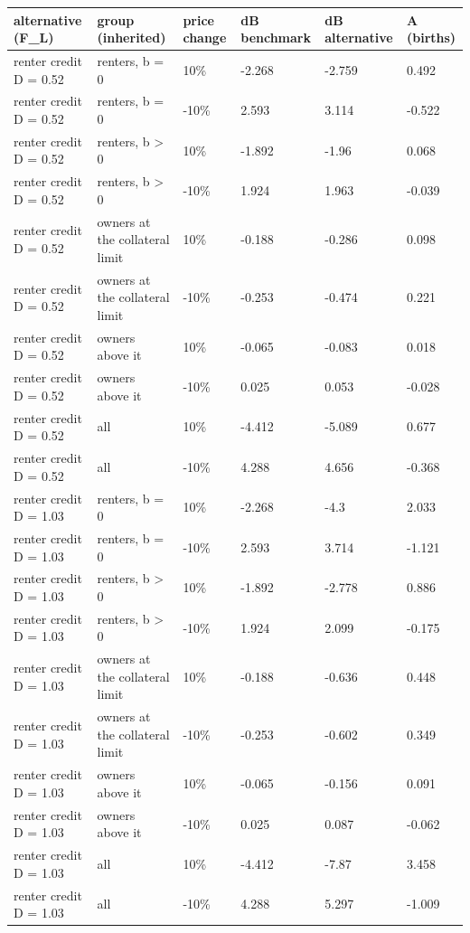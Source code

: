 \begingroup\small
\setlength{\tabcolsep}{3pt}
\renewcommand{\arraystretch}{1.04}
\begin{tabularx}{\linewidth}{XXXXXX}
\toprule
alternative (F\_L) & group (inherited) & price change & dB benchmark & dB alternative & A (births) \\
\midrule
renter credit D = 0.52 & renters, b = 0 & 10\% & -2.268 & -2.759 & 0.492 \\
renter credit D = 0.52 & renters, b = 0 & -10\% & 2.593 & 3.114 & -0.522 \\
renter credit D = 0.52 & renters, b \textgreater{} 0 & 10\% & -1.892 & -1.96 & 0.068 \\
renter credit D = 0.52 & renters, b \textgreater{} 0 & -10\% & 1.924 & 1.963 & -0.039 \\
renter credit D = 0.52 & owners at the collateral limit & 10\% & -0.188 & -0.286 & 0.098 \\
renter credit D = 0.52 & owners at the collateral limit & -10\% & -0.253 & -0.474 & 0.221 \\
renter credit D = 0.52 & owners above it & 10\% & -0.065 & -0.083 & 0.018 \\
renter credit D = 0.52 & owners above it & -10\% & 0.025 & 0.053 & -0.028 \\
renter credit D = 0.52 & all & 10\% & -4.412 & -5.089 & 0.677 \\
renter credit D = 0.52 & all & -10\% & 4.288 & 4.656 & -0.368 \\
renter credit D = 1.03 & renters, b = 0 & 10\% & -2.268 & -4.3 & 2.033 \\
renter credit D = 1.03 & renters, b = 0 & -10\% & 2.593 & 3.714 & -1.121 \\
renter credit D = 1.03 & renters, b \textgreater{} 0 & 10\% & -1.892 & -2.778 & 0.886 \\
renter credit D = 1.03 & renters, b \textgreater{} 0 & -10\% & 1.924 & 2.099 & -0.175 \\
renter credit D = 1.03 & owners at the collateral limit & 10\% & -0.188 & -0.636 & 0.448 \\
renter credit D = 1.03 & owners at the collateral limit & -10\% & -0.253 & -0.602 & 0.349 \\
renter credit D = 1.03 & owners above it & 10\% & -0.065 & -0.156 & 0.091 \\
renter credit D = 1.03 & owners above it & -10\% & 0.025 & 0.087 & -0.062 \\
renter credit D = 1.03 & all & 10\% & -4.412 & -7.87 & 3.458 \\
renter credit D = 1.03 & all & -10\% & 4.288 & 5.297 & -1.009 \\
\bottomrule
\end{tabularx}
\endgroup
